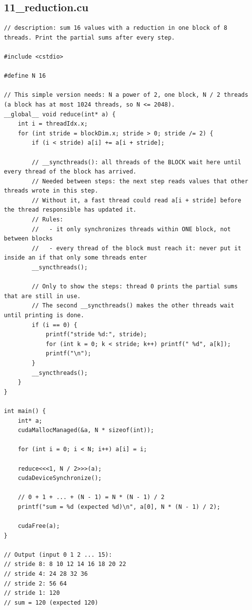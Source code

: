 \documentclass[main.tex]{subfiles}
\begin{document}
\subsection{11\_reduction.cu}
\begin{lstlisting}[language=CUDA]
// description: sum 16 values with a reduction in one block of 8 threads. Print the partial sums after every step.

#include <cstdio>

#define N 16

// This simple version needs: N a power of 2, one block, N / 2 threads (a block has at most 1024 threads, so N <= 2048).
__global__ void reduce(int* a) {
    int i = threadIdx.x;
    for (int stride = blockDim.x; stride > 0; stride /= 2) {
        if (i < stride) a[i] += a[i + stride];

        // __syncthreads(): all threads of the BLOCK wait here until every thread of the block has arrived.
        // Needed between steps: the next step reads values that other threads wrote in this step.
        // Without it, a fast thread could read a[i + stride] before the thread responsible has updated it.
        // Rules:
        //   - it only synchronizes threads within ONE block, not between blocks
        //   - every thread of the block must reach it: never put it inside an if that only some threads enter
        __syncthreads();

        // Only to show the steps: thread 0 prints the partial sums that are still in use.
        // The second __syncthreads() makes the other threads wait until printing is done.
        if (i == 0) {
            printf("stride %d:", stride);
            for (int k = 0; k < stride; k++) printf(" %d", a[k]);
            printf("\n");
        }
        __syncthreads();
    }
}

int main() {
    int* a;
    cudaMallocManaged(&a, N * sizeof(int));

    for (int i = 0; i < N; i++) a[i] = i;

    reduce<<<1, N / 2>>>(a);
    cudaDeviceSynchronize();

    // 0 + 1 + ... + (N - 1) = N * (N - 1) / 2
    printf("sum = %d (expected %d)\n", a[0], N * (N - 1) / 2);

    cudaFree(a);
}

// Output (input 0 1 2 ... 15):
// stride 8: 8 10 12 14 16 18 20 22
// stride 4: 24 28 32 36
// stride 2: 56 64
// stride 1: 120
// sum = 120 (expected 120)
\end{lstlisting}
\end{document}
